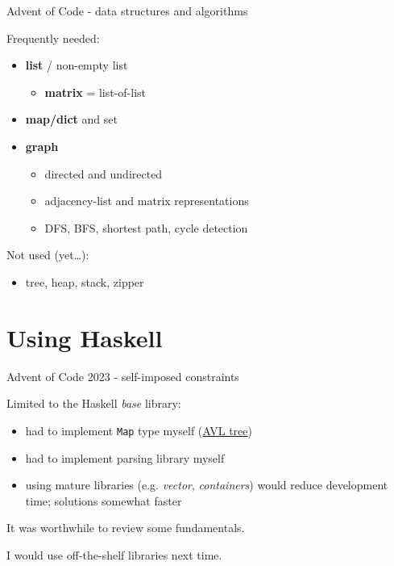 \documentclass[ignorenonframetext,aspectratio=169,12pt]{beamer}
\begin{document}
\begin{frame}{Advent of Code - data structures and algorithms}

    Frequently needed:

    \begin{itemize}
        \item {\bf list} / non-empty list
            \begin{itemize}
                \item {\bf matrix} = list-of-list
            \end{itemize}
        \item {\bf map/dict} and set
        \item {\bf graph}
            \begin{itemize}
                \item directed and undirected
                \item adjacency-list and matrix representations
                \item DFS, BFS, shortest path, cycle detection
            \end{itemize}
    \end{itemize}

    Not used (yet\ldots{}):

    \begin{itemize}
        \item tree, heap, stack, zipper
    \end{itemize}

\end{frame}

\section{Using Haskell}

\begin{frame}{Advent of Code 2023 - self-imposed constraints}

Limited to the Haskell {\em base} library:

\begin{itemize}
    \item had to implement {\tt Map} type myself
        (\href{https://en.wikipedia.org/wiki/AVL_tree}{AVL tree})
    \item had to implement parsing library myself
    \item using mature libraries (e.g. {\em vector}, {\em
        containers}) would reduce development time; solutions
        somewhat faster
\end{itemize}

It was worthwhile to review some fundamentals.

I would use off-the-shelf libraries next time.

\end{frame}
\end{document}
